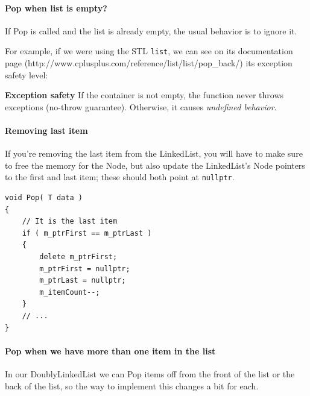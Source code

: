 \documentclass[a4paper,12pt,oneside]{book}
\begin{document}
        \paragraph{Pop when list is empty?}
        
            If Pop is called and the list is already empty, the usual
            behavior is to ignore it.
            
            For example, if we were using the STL \texttt{list},
            we can see on its documentation page
            (http://www.cplusplus.com/reference/list/list/pop\_back/) its
            exception safety level:
            
            \begin{center}
                \begin{mdframed}
                    \textbf{Exception safety}
                    If the container is not empty, the function never 
                    throws exceptions (no-throw guarantee).
                    Otherwise, it causes \textit{undefined behavior}.
                \end{mdframed}
            \end{center}
        
        \paragraph{Removing last item}
        
            If you're removing the last item from the LinkedList, you
            will have to make sure to free the memory for the Node,
            but also update the LinkedList's Node pointers to the 
            first and last item; these should both point at \texttt{nullptr}.
            
\begin{lstlisting}[style=code]
void Pop( T data )
{
    // It is the last item
    if ( m_ptrFirst == m_ptrLast )
    {
        delete m_ptrFirst;
        m_ptrFirst = nullptr;
        m_ptrLast = nullptr;
        m_itemCount--;
    }
    // ...
}
\end{lstlisting}
        
        \paragraph{Pop when we have more than one item in the list}
        
            In our DoublyLinkedList we can Pop items off from the front
            of the list or the back of the list, so the way to
            implement this changes a bit for each.
        
\end{document}
